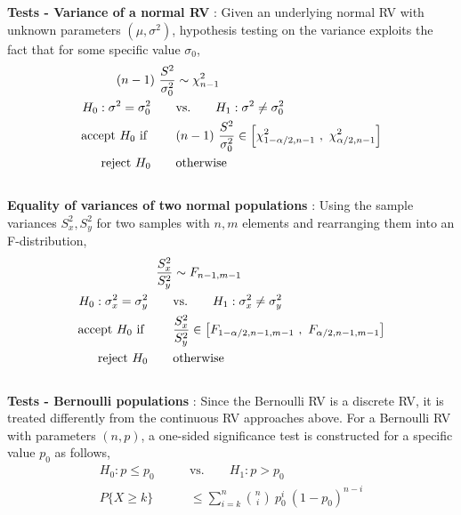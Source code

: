 \textbf{Tests - Variance of a normal RV} : Given an underlying normal RV with unknown parameters $ (\mu, \sigma^2) $, hypothesis testing on the variance exploits the fact that for some specific value $ \sigma_0 $, \\

\begin{align}
	(n-1)\ \frac{S^2}{\sigma_0^2} &\sim \chi^2_{n-1} \nonumber \\
	H_0 : \sigma^2 = \sigma_0^2 \qquad &\text{vs.} \qquad H_1 : \sigma^2 \neq \sigma_0^2 \\
	\text{accept $ H_0 $ if } \qquad & (n-1)\ \frac{S^2}{\sigma_0^2} \in \left[ \chi^2_{1 - \alpha/2, n-1}\ ,\ \chi^2_{\alpha/2, n-1} \right] \\
	\text{reject $ H_0 $} \qquad & \text{otherwise}
\end{align}\\

\textbf{Equality of variances of two normal populations} : Using the sample variances $ S_x^2, S_y^2 $ for two samples with $ n, m $ elements and rearranging them into an F-distribution, \\

\begin{align}
	\frac{S^2_x}{S^2_y} &\sim F_{n-1, m-1} \nonumber \\
	H_0 : \sigma_x^2 = \sigma_y^2 \qquad &\text{vs.} \qquad H_1 : \sigma_x^2 \neq \sigma_y^2 \nonumber \\
	\text{accept $ H_0 $ if } \qquad & \frac{S^2_x}{S^2_y} \in \left[ F_{1 - \alpha/2, n-1, m-1}\ ,\ F_{\alpha/2, n-1, m-1} \right] \nonumber \\
	\text{reject $ H_0 $} \qquad & \text{otherwise}
\end{align}\\

\textbf{Tests - Bernoulli populations} : Since the Bernoulli RV is a discrete RV, it is treated differently from the continuous RV approaches above. For a Bernoulli RV with parameters $ (n, p) $, a one-sided significance test is constructed for a specific value $ p_0 $ as follows,\\

\begin{align}
	H_0 : p  \leq p_0 \qquad &\text{vs.} \qquad H_1 : p  > p_0 \\
	P \{X \geq k\} &\leq \sum\limits_{i=k}^{n} \binom{n}{i}\ p_0^i\ (1-p_0)^{n-i}
\end{align}\\

